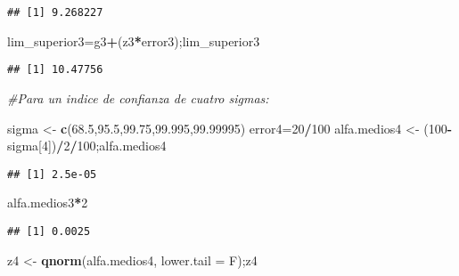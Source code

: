 \documentclass[
]{article}
\newenvironment{Shaded}{\begin{snugshade}}{\end{snugshade}}
\newcommand{\AttributeTok}[1]{\textcolor[rgb]{0.13,0.29,0.53}{#1}}
\newcommand{\CommentTok}[1]{\textcolor[rgb]{0.56,0.35,0.01}{\textit{#1}}}
\newcommand{\DecValTok}[1]{\textcolor[rgb]{0.00,0.00,0.81}{#1}}
\newcommand{\FloatTok}[1]{\textcolor[rgb]{0.00,0.00,0.81}{#1}}
\newcommand{\FunctionTok}[1]{\textcolor[rgb]{0.13,0.29,0.53}{\textbf{#1}}}
\newcommand{\NormalTok}[1]{#1}
\newcommand{\OtherTok}[1]{\textcolor[rgb]{0.56,0.35,0.01}{#1}}
\newcommand{\SpecialCharTok}[1]{\textcolor[rgb]{0.81,0.36,0.00}{\textbf{#1}}}
\begin{document}
\begin{verbatim}
## [1] 9.268227
\end{verbatim}

\begin{Shaded}
\begin{Highlighting}[]
\NormalTok{lim\_superior3}\OtherTok{=}\NormalTok{g3}\SpecialCharTok{+}\NormalTok{(z3}\SpecialCharTok{*}\NormalTok{error3);lim\_superior3}
\end{Highlighting}
\end{Shaded}

\begin{verbatim}
## [1] 10.47756
\end{verbatim}

\begin{Shaded}
\begin{Highlighting}[]
\CommentTok{\#Para un indice de confianza de cuatro sigmas:}

\NormalTok{sigma }\OtherTok{\textless{}{-}} \FunctionTok{c}\NormalTok{(}\FloatTok{68.5}\NormalTok{,}\FloatTok{95.5}\NormalTok{,}\FloatTok{99.75}\NormalTok{,}\FloatTok{99.995}\NormalTok{,}\FloatTok{99.99995}\NormalTok{)}
\NormalTok{error4}\OtherTok{=}\DecValTok{20}\SpecialCharTok{/}\DecValTok{100}
\NormalTok{alfa.medios4 }\OtherTok{\textless{}{-}}\NormalTok{ (}\DecValTok{100}\SpecialCharTok{{-}}\NormalTok{sigma[}\DecValTok{4}\NormalTok{])}\SpecialCharTok{/}\DecValTok{2}\SpecialCharTok{/}\DecValTok{100}\NormalTok{;alfa.medios4}
\end{Highlighting}
\end{Shaded}

\begin{verbatim}
## [1] 2.5e-05
\end{verbatim}

\begin{Shaded}
\begin{Highlighting}[]
\NormalTok{alfa.medios3}\SpecialCharTok{*}\DecValTok{2}
\end{Highlighting}
\end{Shaded}

\begin{verbatim}
## [1] 0.0025
\end{verbatim}

\begin{Shaded}
\begin{Highlighting}[]
\NormalTok{z4 }\OtherTok{\textless{}{-}} \FunctionTok{qnorm}\NormalTok{(alfa.medios4, }\AttributeTok{lower.tail =}\NormalTok{ F);z4}
\end{Highlighting}
\end{Shaded}
\end{document}
